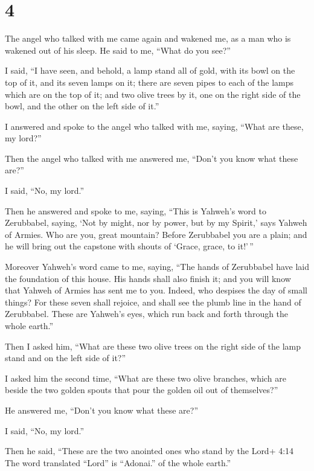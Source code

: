 \hypertarget{section-3}{%
\section{4}\label{section-3}}

 The angel who talked with me came again and wakened me, as
a man who is wakened out of his sleep.  He said to me,
``What do you see?''

I said, ``I have seen, and behold, a lamp stand all of gold, with its
bowl on the top of it, and its seven lamps on it; there are seven pipes
to each of the lamps which are on the top of it;  and two
olive trees by it, one on the right side of the bowl, and the other on
the left side of it.''

 I answered and spoke to the angel who talked with me,
saying, ``What are these, my lord?''

 Then the angel who talked with me answered me, ``Don't you
know what these are?''

I said, ``No, my lord.''

 Then he answered and spoke to me, saying, ``This is
Yahweh's word to Zerubbabel, saying, `Not by might, nor by power, but by
my Spirit,' says Yahweh of Armies.  Who are you, great
mountain? Before Zerubbabel you are a plain; and he will bring out the
capstone with shouts of `Grace, grace, to it!'\,''

 Moreover Yahweh's word came to me, saying, 
``The hands of Zerubbabel have laid the foundation of this house. His
hands shall also finish it; and you will know that Yahweh of Armies has
sent me to you.  Indeed, who despises the day of small
things? For these seven shall rejoice, and shall see the plumb line in
the hand of Zerubbabel. These are Yahweh's eyes, which run back and
forth through the whole earth.''

 Then I asked him, ``What are these two olive trees on the
right side of the lamp stand and on the left side of it?''

 I asked him the second time, ``What are these two olive
branches, which are beside the two golden spouts that pour the golden
oil out of themselves?''

 He answered me, ``Don't you know what these are?''

I said, ``No, my lord.''

 Then he said, ``These are the two anointed ones who stand
by the Lord+ 4:14 The word translated ``Lord'' is ``Adonai.'' of the
whole earth.''

